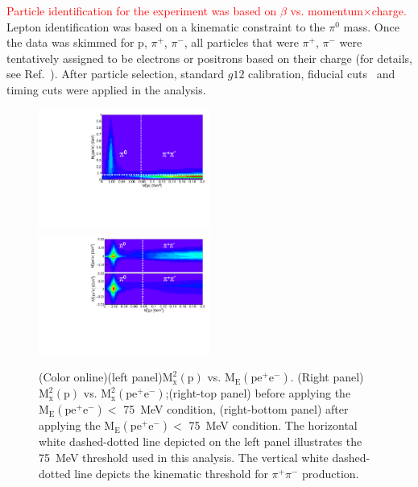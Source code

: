 \documentclass[aps,prc,twocolumn,floatfix,showpacs,preprintnumbers,amsmath,amssymb,superscriptaddress,linenumbers]{revtex4-1}
\begin{document}

\textcolor{red}{Particle identification for 
	the experiment was based on $\beta$ vs. momentum$\times$charge.} Lepton identification was based on a kinematic constraint to the $\pi^0$ mass. Once the data was skimmed for p, $\pi^+$, $\pi^-$, 
all particles that were $\pi^+$, $\pi^-$ were tentatively assigned 
to be electrons or positrons based on their charge (for details, 
see Ref.~\cite{Kunkel}). After particle selection, standard $g12$ 
calibration, fiducial cuts~\cite{g12} and timing cuts were applied 
in the analysis.
\begin{figure}[htb!]
        \centerline{
               \includegraphics[height=0.35\textwidth,width=0.5\textwidth]{ME_vs_mxpcompare.pdf}\hfill
               \includegraphics[height=0.35\textwidth,width=0.5\textwidth]{mm2_vs_mxp_compare.pdf}}

        \caption{(Color online)(left panel)$\mathrm{M_x^2(p)}$ vs.
        $\mathrm{M_E(pe^+e^-)}$. (Right panel)$\mathrm{M_x^2(p)}$ vs.
        $\mathrm{M_x^2(pe^+e^-)}$;(right-top panel) before applying the
        $\mathrm{M_E(pe^+e^-)} <$ 75~MeV condition, (right-bottom panel)
        after applying the $\mathrm{M_E(pe^+e^-)} <$ 75~MeV condition.
        The horizontal white dashed-dotted line depicted on the left
        panel illustrates the 75~MeV threshold used in this analysis.
        The vertical white dashed-dotted line depicts the kinematic
        threshold for $\pi^+\pi^-$ production.
        }\label{fig:sys}
\end{figure}
\end{document}

